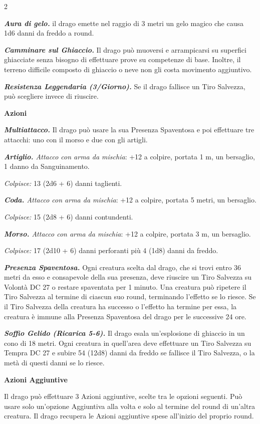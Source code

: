 \begin{multicols}{2}
{\emph{\textbf{Aura di gelo.}} il drago emette nel raggio di 3 metri un gelo magico che causa 1d6 danni da freddo a round.

\emph{\textbf{Camminare sul Ghiaccio.}} Il drago può muoversi e arrampicarsi su superfici ghiacciate senza bisogno di effettuare prove su competenze di base. Inoltre, il terreno difficile composto di ghiaccio o neve non gli costa movimento aggiuntivo.

\emph{\textbf{Resistenza Leggendaria (3/Giorno).}} Se il drago fallisce un Tiro Salvezza, può scegliere invece di riuscire.

\textbf{Azioni}

\emph{\textbf{Multiattacco.}} Il drago può usare la sua Presenza Spaventosa e poi effettuare tre attacchi: uno con il morso e due con gli artigli.

\emph{\textbf{Artiglio.} Attacco con arma da mischia}: +12 a colpire, portata 1 m, un bersaglio, 1 danno da Sanguinamento.

\emph{Colpisce:} 13 (2d6 + 6) danni taglienti.

\emph{\textbf{Coda.} Attacco con arma da mischia}: +12 a colpire, portata 5 metri, un bersaglio.

\emph{Colpisce:} 15 (2d8 + 6) danni contundenti.

\emph{\textbf{Morso.} Attacco con arma da mischia}: +12 a colpire, portata 3 m, un bersaglio.

\emph{Colpisce:} 17 (2d10 + 6) danni perforanti più 4 (1d8) danni da freddo.

\emph{\textbf{Presenza Spaventosa.}} Ogni creatura scelta dal drago, che si trovi entro 36 metri da esso e consapevole della sua presenza, deve riuscire un Tiro Salvezza su Volontà DC 27 o restare spaventata per 1 minuto. Una creatura può ripetere il Tiro Salvezza al termine di ciascun suo round, terminando l'effetto se lo riesce. Se il Tiro Salvezza della creatura ha successo o l'effetto ha termine per essa, la creatura è immune alla Presenza Spaventosa del drago per le successive 24 ore.

\emph{\textbf{Soffio Gelido (Ricarica 5-6).}} Il drago esala un'esplosione di ghiaccio in un cono di 18 metri. Ogni creatura in quell'area deve effettuare un Tiro Salvezza su Tempra DC 27 e subire 54 (12d8) danni da freddo se fallisce il Tiro Salvezza, o la metà di questi danni se lo riesce.

\textbf{Azioni Aggiuntive}

Il drago può effettuare 3 Azioni aggiuntive, scelte tra le opzioni seguenti. Può usare solo un'opzione Aggiuntiva alla volta e solo al termine del round di un'altra creatura. Il drago recupera le Azioni aggiuntive spese all'inizio del proprio round.

}
\end{multicols}
